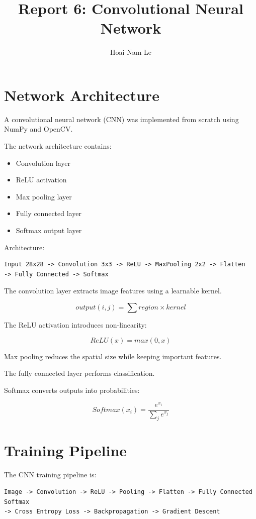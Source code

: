 \documentclass{article}
\title{Report 6: Convolutional Neural Network}
\author{Hoai Nam Le}
\begin{document}
\maketitle

\section{Network Architecture}

A convolutional neural network (CNN) was
implemented from scratch using NumPy and OpenCV.

The network architecture contains:

\begin{itemize}
    \item Convolution layer
    \item ReLU activation
    \item Max pooling layer
    \item Fully connected layer
    \item Softmax output layer
\end{itemize}

Architecture:

\begin{verbatim}
Input 28x28 -> Convolution 3x3 -> ReLU -> MaxPooling 2x2 -> Flatten 
-> Fully Connected -> Softmax
\end{verbatim}

The convolution layer extracts image features
using a learnable kernel.

\[
output(i,j)=\sum region \times kernel
\]

The ReLU activation introduces non-linearity:

\[
ReLU(x)=max(0,x)
\]

Max pooling reduces the spatial size while
keeping important features.

The fully connected layer performs classification.

Softmax converts outputs into probabilities:

\[
Softmax(x_i)=
\frac{e^{x_i}}
{\sum_j e^{x_j}}
\]

\section{Training Pipeline}

The CNN training pipeline is:

\begin{verbatim}
Image -> Convolution -> ReLU -> Pooling -> Flatten -> Fully Connected Softmax 
-> Cross Entropy Loss -> Backpropagation -> Gradient Descent
\end{verbatim}
\end{document}
